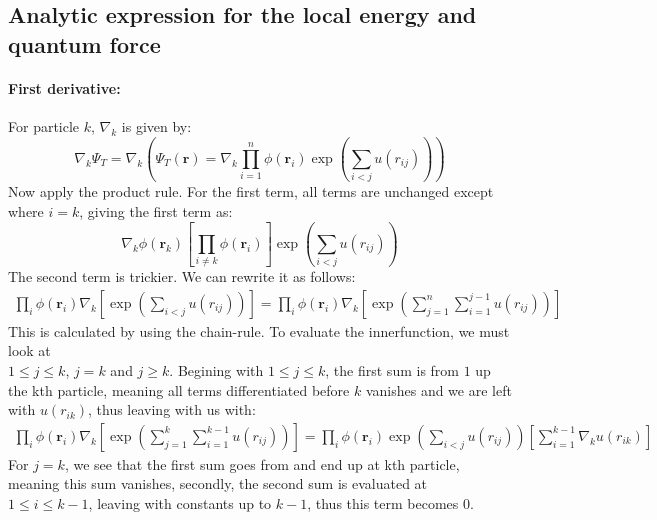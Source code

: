 \documentclass[a4paper, 10pt]{article}
\begin{document}
	\begin{appendices}
		\section{Analytic expression for the local energy and quantum force}\label{ap:analytic_expression_for_the_local_energy_and_quantum_force}
		\paragraph{First derivative:}
		For particle $k$, $\nabla_k$ is given by:
		\begin{equation}
		\nabla_k\Psi_{T} = \nabla_k\left(\Psi_T(\mathbf{r})=\nabla_k \prod_{i=1}^n\phi(\mathbf{r}_i)\exp\left(\sum_{i<j} u(r_{ij})\right)\right)
		\end{equation}
		Now apply the product rule. For the first term, all terms are unchanged except where $i=k$, giving the first term as:
		\begin{equation}
		\nabla_k \phi(\mathbf{r}_k)\left[ \prod_{i\neq k} \phi(\mathbf{r}_i)\right]\exp\left(\sum_{i<j}u(r_{ij})\right)
		\end{equation}
		The second term is trickier. We can rewrite it as follows:
		\begin{align}
		\prod_{i}\phi(\boldsymbol{r}_{i})\nabla_{k}\left[\exp\left(\sum_{i < j}u(r_{ij})\right)\right]
		= \prod_{i}\phi(\boldsymbol{r}_{i})\nabla_{k}\left[\exp\left(\sum_{j = 1}^{n}\sum_{i = 1}^{j-1}u(r_{ij})\right)\right]
		\label{second term in first derivative}
		\end{align}
		This is calculated by using the chain-rule. To evaluate the innerfunction, we must look
		at \\$1 \le j \le k$, $j = k$ and $j \ge k$. Begining with $1\le  j \le k$,
		the first sum is from $1$ up the kth particle, meaning all terms differentiated before $k$ vanishes
		and we are left with $u(r_{ik})$, thus leaving with us with:
		\begin{align}
		\prod_{i}\phi(\boldsymbol{r}_{i})\nabla_{k}\left[\exp\left(\sum_{j = 1}^{k}\sum_{i = 1}^{k-1}u(r_{ij})\right)\right]
		=
		\prod_{i}\phi(\boldsymbol{r}_{i})\exp{\left(\sum_{i<j}u(r_{ij})\right)}
		\left[\sum_{i = 1}^{k-1}\nabla_{k}u(r_{ik})\right]
		\end{align}
		For $j = k$, we see that the first sum goes from and end up at kth particle, meaning
		this sum vanishes, secondly, the second sum is evaluated at $1 \le i \le k-1$, leaving with
		constants up to $k-1$, thus this term becomes $0$.
		\begin{align}

\end{align}
\end{appendices}
\end{document}
